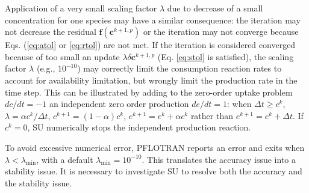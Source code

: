 \documentclass[gmd, manuscript]{copernicus}
\begin{document}
Application of a very small scaling factor $\lambda$ due to decrease of a small
concentration for one species may have a similar consequence: the iteration may
not decrease the residual $\mathbf{f}(\mathbf{c}^{k+1,p})$ or the iteration
may not converge because Eqs. (\ref{eq:atol} or \ref{eq:rtol}) are not met. If
the iteration is considered converged because of too small an update $\lambda
\delta \mathbf{c}^{k+1,p}$ (Eq. \ref{eq:stol} is satisfied), the scaling factor
$\lambda$ (e.g., $10^{-10}$) may correctly limit the consumption reaction
rates to account for availability limitation, but wrongly limit the production
rate in the time step. This can be illustrated by adding to the zero-order
uptake problem $dc/dt=-1$ an independent zero order production $de/dt=1$: when
$\Delta t \geq c^k$, $\lambda =\alpha c^k/\Delta t$, $c^{k+1}=(1-\alpha)c^k$,
$e^{k+1}=e^k+\alpha c^k$ rather than $e^{k+1}=e^k+\Delta t$. If $c^k=0$, SU
numerically stops the independent production reaction. 

To avoid excessive numerical error, PFLOTRAN reports an error and exits when
$\lambda < \lambda _\text{min}$, with a default $\lambda _\text{min}=10^{-10}$.
This translates the accuracy issue into a stability issue. It is necessary to
investigate SU to resolve both the accuracy and the stability issue. 

\end{document}
